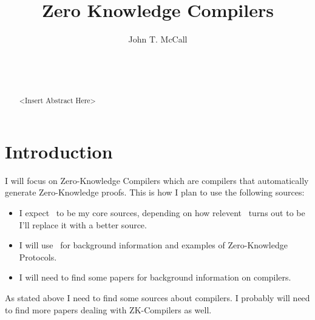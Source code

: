 \documentclass{sig-alternate}
\begin{document}

\title{Zero Knowledge Compilers}


\author{
\alignauthor
John T. McCall\\
	\\
	\\
	\\
}

\maketitle

\begin{abstract}
<Insert Abstract Here>
\end{abstract}



\section{Introduction}
I will focus on Zero-Knowledge Compilers which are compilers that automatically generate Zero-Knowledge proofs. This is how I plan to use the following sources:
\begin{itemize}
\item I expect~\cite{ZKCrypt:2012, Sigma:2009, ZKPDL:2010} to be my core sources, depending on how relevent~\cite{ZKPDL:2010} turns out to be I'll replace it with a better source.
\item I will use~\cite{MentalGame:1987, Survey, Children:1987} for background information and examples of Zero-Knowledge Protocols. 
\item I will need to find some papers for background information on compilers.
\end{itemize}

As stated above I need to find some sources about compilers. I probably will need to find more papers dealing with ZK-Compilers as well.




\end{document}

